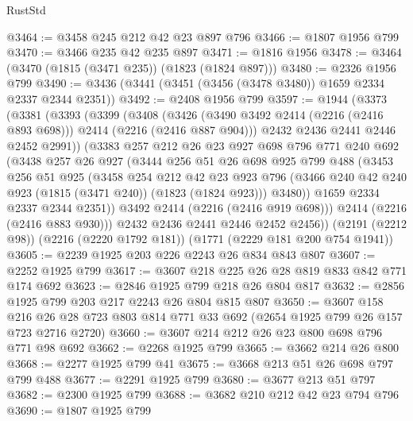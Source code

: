 \begin{lexlean}{RustStd}
\begin{coremodule}
@3464 := @3458 @245 @212 @42 @23 @897 @796
@3466 := @1807 @1956 @799
@3470 := @3466 @235 @42 @235 @897
@3471 := @1816 @1956
@3478 := @3464 (@3470 (@1815 (@3471 @235)) (@1823 (@1824 @897)))
@3480 := @2326 @1956 @799
@3490 := @3436 (@3441 (@3451 (@3456 (@3478 @3480)) @1659 @2334 @2337 @2344 @2351))
@3492 := @2408 @1956 @799
@3597 := @1944
    (@3373
      (@3381
        (@3393
          (@3399
            (@3408
              (@3426 (@3490 @3492 @2414 (@2216 (@2416 @893 @698))) @2414 (@2216 (@2416 @887 @904)))
              @2432
              @2436
              @2441
              @2446
              @2452
              @2991))
          (@3383
            @257
            @212
            @26
            @23
            @927
            @698
            @796
            @771
            @240
            @692
            (@3438
              @257
              @26
              @927
              (@3444
                @256
                @51
                @26
                @698
                @925
                @799
                @488
                (@3453
                  @256
                  @51
                  @925
                  (@3458
                    @254
                    @212
                    @42
                    @23
                    @923
                    @796
                    (@3466 @240 @42 @240 @923 (@1815 (@3471 @240)) (@1823 (@1824 @923)))
                    @3480))
                @1659
                @2334
                @2337
                @2344
                @2351))
            @3492
            @2414
            (@2216 (@2416 @919 @698)))
          @2414
          (@2216 (@2416 @883 @930)))
        @2432
        @2436
        @2441
        @2446
        @2452
        @2456))
    (@2191 (@2212 @98))
    (@2216 (@2220 @1792 @181))
    (@1771 (@2229 @181 @200 @754 @1941))
@3605 := @2239 @1925 @203 @226 @2243 @26 @834 @843 @807
@3607 := @2252 @1925 @799
@3617 := @3607 @218 @225 @26 @28 @819 @833 @842 @771 @174 @692
@3623 := @2846 @1925 @799 @218 @26 @804 @817
@3632 := @2856 @1925 @799 @203 @217 @2243 @26 @804 @815 @807
@3650 := @3607
    @158
    @216
    @26
    @28
    @723
    @803
    @814
    @771
    @33
    @692
    (@2654 @1925 @799 @26 @157 @723 @2716 @2720)
@3660 := @3607 @214 @212 @26 @23 @800 @698 @796 @771 @98 @692
@3662 := @2268 @1925 @799
@3665 := @3662 @214 @26 @800
@3668 := @2277 @1925 @799 @41
@3675 := @3668 @213 @51 @26 @698 @797 @799 @488
@3677 := @2291 @1925 @799
@3680 := @3677 @213 @51 @797
@3682 := @2300 @1925 @799
@3688 := @3682 @210 @212 @42 @23 @794 @796
@3690 := @1807 @1925 @799

\end{coremodule}
\end{lexlean}
